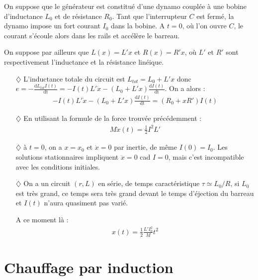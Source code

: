 \documentclass{report}
\begin{document}
On suppose que le générateur est constitué d'une dynamo couplée à une bobine d'inductance $L_0$ et de résistance $R_0$. Tant que l'interrupteur $C$ est fermé, la dynamo impose un fort courant $I_0$ dans la bobine. A $t=0$, où l'on ouvre $C$, le courant s'écoule alors dans les rails et accélère le barreau. 

On suppose par ailleurs que $L(x)=L'x$ et $R(x)=R'x$, où $L'$ et $R'$ sont respectivement l'inductance et la résistance linéique.

\begin{itemize}

	\item[$\diamondsuit$] L'inductance totale du circuit est $L_{tot}=L_0+L'x$ donc $e=-\frac{\mathrm{d}L_{tot}I(t)}{\mathrm{dt}}=-I(t)L'\dot{x}-(L_0+L'x)\frac{\mathrm{d}I(t)}{\mathrm{dt}}$. On a alors :
	\begin{align*}
		-I(t)L'\dot{x}-(L_0+L'x)\frac{\mathrm{d}I(t)}{\mathrm{dt}} = (R_0+xR')I(t)
	\end{align*}
	
	\item[$\diamondsuit$] En utilisant la formule de la force trouvée précédemment :
	\begin{align*}
		M\ddot{x}(t)=\frac{1}{2}I^2L'
	\end{align*}
	
	\item[$\diamondsuit$] à $t=0$, on a $x=x_0$ et $\dot{x}=0$ par inertie, de même $I(0)=I_0$. Les solutions stationnaires impliquent $\ddot{x}=0$ cad $I=0$, mais c'est incompatible avec les conditions initiales. 
	
	\item[$\diamondsuit$] On a un circuit $(r,L)$ en série, de temps caractéristique $\tau\simeq L_0/R$, si $L_0$ est très grand, ce temps sera très grand devant le temps d'éjection du barreau et $I(t)$ n'aura quasiment pas varié. 
	
	A ce moment là :
	\begin{align*}		
		x(t)=\frac{1}{2}\frac{L'I_0^2}{M} t^2	
	\end{align*}

\end{itemize}

\section*{Chauffage par induction}
\end{document}
